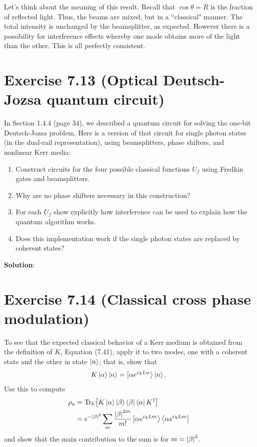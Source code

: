 \documentclass{book}
\begin{document}
    Let's think about the meaning of this result. Recall that $\cos\theta = R$ is the fraction of reflected light. Thus, the beams are mixed, but in a ``classical" manner. The total intensity is unchanged by the beamsplitter, as expected. However there is a possibility for interference effects whereby one mode obtains more of the light than the other. This is all perfectly consistent. 

\section*{Exercise 7.13 (Optical Deutsch-Jozsa quantum circuit)}
    In Section 1.4.4 (page 34), we described a quantum circuit for solving the one-bit Deutsch-Jozsa problem. Here is a version of that circuit for single photon states (in the dual-rail representation), using beamsplitters, phase shifters, and nonlinear Kerr media:

    \begin{enumerate}
        \item Construct circuits for the four possible classical functions $U_f$ using Fredkin gates and beamsplitters.
        \item Why are no phase shifters necessary in this construction?
        \item For each $U_f$ show explicitly how interference can be used to explain how the quantum algorithm works.
        \item Does this implementation work if the single photon states are replaced by coherent states?
    \end{enumerate}

    \textbf{Solution}:

\section*{Exercise 7.14 (Classical cross phase modulation)}
    To see that the expected classical behavior of a Kerr medium is obtained from the definition of $K$, Equation (7.41), apply it to two modes, one with a coherent state and the other in state $\ket{n}$; that is, show that
    \begin{align}
        K\ket{\alpha}\ket{n} = \ket{\alpha e^{i\chi L n}} \ket{n}.
    \end{align}
    Use this to compute
    \begin{align}
        \rho_a &= \Tr_b \left[K\ket{\alpha}\ket{\beta}\bra{\beta}\bra{\alpha}K^\dagger\right] \\
        &= e^{-\abs{\beta}^2} \sum_{m} \frac{\abs{\beta}^{2m}}{m!} \ket{\alpha e^{i\chi Lm}}\bra{\alpha e^{i\chi Lm}}
    \end{align}
    and show that the main contribution to the sum is for $m = \abs{\beta}^2$.
\end{document}
